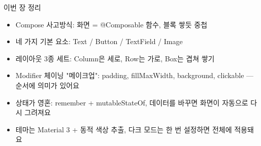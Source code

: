 \begin{tcbsummary}{이번 장 정리}
\begin{itemize}
  \item Compose 사고방식: 화면 = @Composable 함수, 블록 쌓듯 중첩
  \item 네 가지 기본 요소: Text / Button / TextField / Image
  \item 레이아웃 3종 세트: Column은 세로, Row는 가로, Box는 겹쳐 쌓기
  \item Modifier 체이닝 "메이크업": padding, fillMaxWidth, background, clickable — 순서에 의미가 있어요
  \item 상태가 영혼: remember + mutableStateOf, 데이터를 바꾸면 화면이 자동으로 다시 그려져요
  \item 테마는 Material 3 + 동적 색상 추출, 다크 모드는 한 번 설정하면 전체에 적용돼요
\end{itemize}

\end{tcbsummary}
